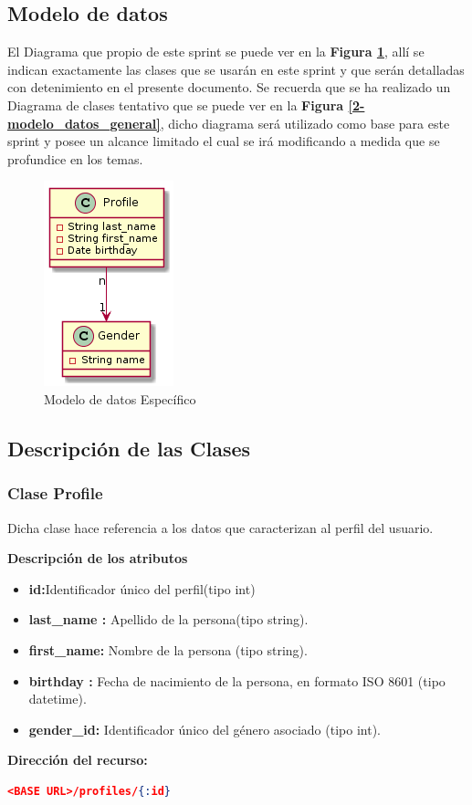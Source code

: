 \subsection{Modelo de datos}

El Diagrama que propio de este sprint se puede ver en la \textbf{Figura \ref{modeloEspecifico}}, allí se indican exactamente las clases que se usarán en este sprint y que serán detalladas con detenimiento en el presente documento. Se recuerda que se ha realizado un Diagrama de clases tentativo que se puede ver en la \textbf{Figura \ref{2-modelo_datos_general}}, dicho diagrama  será utilizado como base para este sprint y posee un alcance limitado el cual se irá modificando a medida que se profundice en los temas.



\begin{figure}[h]
  \centering
  \includegraphics[width=.2\textwidth]{img/tp1_parte2/1-modelo_dato_especifico}
  \caption{Modelo de datos Específico}
  \label{modeloEspecifico}
\end{figure}
\clearpage

\subsection{Descripción de las Clases}

    \subsubsection{Clase Profile}
    Dicha clase hace referencia a los datos que caracterizan al perfil del usuario.

    \textbf{Descripción de los atributos}
    \begin{itemize}
            \item \textbf{id:}Identificador único del perfil(tipo int)
			\item\textbf{ last\_name 	:}	Apellido de la persona(tipo string).
			\item \textbf{ first\_name: } 	Nombre de la persona (tipo string).
			\item \textbf{birthday 	:}	Fecha de nacimiento de la persona, en formato ISO 8601 (tipo datetime).
			\item \textbf{gender\_id:} 	Identificador único del género asociado 	(tipo int).
    \end{itemize} 
	\textbf{Dirección del recurso:}
    \begin{lstlisting}[language=json,firstnumber=1]
    <BASE URL>/profiles/{:id}
    \end{lstlisting}

